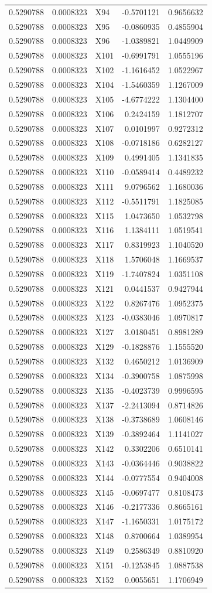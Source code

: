 \documentclass[
]{article}
\begin{document}
\begin{longtable}[]{@{}rrlrr@{}}
0.5290788 & 0.0008323 & X94 & -0.5701121 & 0.9656632\tabularnewline
0.5290788 & 0.0008323 & X95 & -0.0860935 & 0.4855904\tabularnewline
0.5290788 & 0.0008323 & X96 & -1.0389821 & 1.0449909\tabularnewline
0.5290788 & 0.0008323 & X101 & -0.6991791 & 1.0555196\tabularnewline
0.5290788 & 0.0008323 & X102 & -1.1616452 & 1.0522967\tabularnewline
0.5290788 & 0.0008323 & X104 & -1.5460359 & 1.1267009\tabularnewline
0.5290788 & 0.0008323 & X105 & -4.6774222 & 1.1304400\tabularnewline
0.5290788 & 0.0008323 & X106 & 0.2424159 & 1.1812707\tabularnewline
0.5290788 & 0.0008323 & X107 & 0.0101997 & 0.9272312\tabularnewline
0.5290788 & 0.0008323 & X108 & -0.0718186 & 0.6282127\tabularnewline
0.5290788 & 0.0008323 & X109 & 0.4991405 & 1.1341835\tabularnewline
0.5290788 & 0.0008323 & X110 & -0.0589414 & 0.4489232\tabularnewline
0.5290788 & 0.0008323 & X111 & 9.0796562 & 1.1680036\tabularnewline
0.5290788 & 0.0008323 & X112 & -0.5511791 & 1.1825085\tabularnewline
0.5290788 & 0.0008323 & X115 & 1.0473650 & 1.0532798\tabularnewline
0.5290788 & 0.0008323 & X116 & 1.1384111 & 1.0519541\tabularnewline
0.5290788 & 0.0008323 & X117 & 0.8319923 & 1.1040520\tabularnewline
0.5290788 & 0.0008323 & X118 & 1.5706048 & 1.1669537\tabularnewline
0.5290788 & 0.0008323 & X119 & -1.7407824 & 1.0351108\tabularnewline
0.5290788 & 0.0008323 & X121 & 0.0441537 & 0.9427944\tabularnewline
0.5290788 & 0.0008323 & X122 & 0.8267476 & 1.0952375\tabularnewline
0.5290788 & 0.0008323 & X123 & -0.0383046 & 1.0970817\tabularnewline
0.5290788 & 0.0008323 & X127 & 3.0180451 & 0.8981289\tabularnewline
0.5290788 & 0.0008323 & X129 & -0.1828876 & 1.1555520\tabularnewline
0.5290788 & 0.0008323 & X132 & 0.4650212 & 1.0136909\tabularnewline
0.5290788 & 0.0008323 & X134 & -0.3900758 & 1.0875998\tabularnewline
0.5290788 & 0.0008323 & X135 & -0.4023739 & 0.9996595\tabularnewline
0.5290788 & 0.0008323 & X137 & -2.2413094 & 0.8714826\tabularnewline
0.5290788 & 0.0008323 & X138 & -0.3738689 & 1.0608146\tabularnewline
0.5290788 & 0.0008323 & X139 & -0.3892464 & 1.1141027\tabularnewline
0.5290788 & 0.0008323 & X142 & 0.3302206 & 0.6510141\tabularnewline
0.5290788 & 0.0008323 & X143 & -0.0364446 & 0.9038822\tabularnewline
0.5290788 & 0.0008323 & X144 & -0.0777554 & 0.9404008\tabularnewline
0.5290788 & 0.0008323 & X145 & -0.0697477 & 0.8108473\tabularnewline
0.5290788 & 0.0008323 & X146 & -0.2177336 & 0.8665161\tabularnewline
0.5290788 & 0.0008323 & X147 & -1.1650331 & 1.0175172\tabularnewline
0.5290788 & 0.0008323 & X148 & 0.8700664 & 1.0389954\tabularnewline
0.5290788 & 0.0008323 & X149 & 0.2586349 & 0.8810920\tabularnewline
0.5290788 & 0.0008323 & X151 & -0.1253845 & 1.0887538\tabularnewline
0.5290788 & 0.0008323 & X152 & 0.0055651 & 1.1706949\tabularnewline
\bottomrule
\end{longtable}
\end{document}

